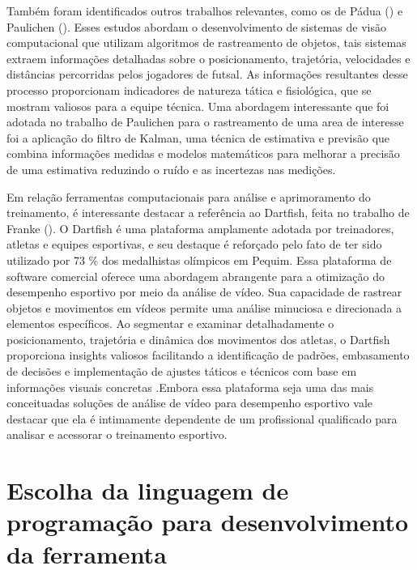 Também foram identificados outros trabalhos relevantes, como os de Pádua (\citeyear{vcFutebol}) e Paulichen (\citeyear{futebolTatica}). Esses estudos abordam o desenvolvimento de sistemas de visão computacional que utilizam algoritmos de rastreamento de objetos, tais sistemas extraem informações detalhadas sobre o posicionamento, trajetória, velocidades e distâncias percorridas pelos jogadores de futsal. As informações resultantes desse processo proporcionam indicadores de natureza tática e fisiológica, que se mostram valiosos para a equipe técnica. Uma abordagem interessante que foi adotada no trabalho de Paulichen para o rastreamento de uma area de interesse foi a aplicação do filtro de Kalman, uma técnica de estimativa e previsão que combina informações medidas e modelos matemáticos para melhorar a precisão de uma estimativa reduzindo o ruído e as incertezas nas medições.

Em relação ferramentas computacionais para análise e aprimoramento do treinamento, é interessante destacar a referência ao Dartfish, feita no trabalho de Franke (\citeyear{vcBicicleta}). O Dartfish é uma plataforma amplamente adotada por treinadores, atletas e equipes esportivas, e seu destaque é reforçado pelo fato de ter sido utilizado por 73 \% dos medalhistas olímpicos em Pequim. Essa plataforma de software comercial oferece uma abordagem abrangente para a otimização do desempenho esportivo por meio da análise de vídeo. Sua capacidade de rastrear objetos e movimentos em vídeos permite uma análise minuciosa e direcionada a elementos específicos. Ao segmentar e examinar detalhadamente o posicionamento, trajetória e dinâmica dos movimentos dos atletas, o Dartfish proporciona insights valiosos facilitando a identificação de padrões, embasamento de decisões e implementação de ajustes táticos e técnicos com base em informações visuais concretas \cite{dartfish}.Embora essa plataforma seja uma das mais conceituadas soluções de análise de vídeo para desempenho esportivo vale destacar que ela é intimamente dependente de um profissional qualificado para analisar e acessorar o treinamento esportivo.




\section[Escolha da linguagem de programação para desenvolvimento da ferramenta]{Escolha da linguagem de programação para desenvolvimento da ferramenta}\label{sec:Escolha da linguagem de programacao para desenvolvimento da ferramenta}

